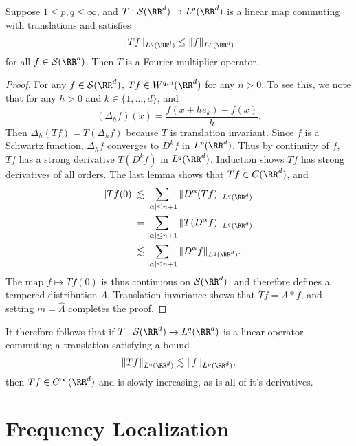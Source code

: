 \begin{theorem}
  Suppose $1 \leq p,q \leq \infty$, and $T: \mathcal{S}(\RR^d) \to L^q(\RR^d)$ is a linear map commuting with translations and satisfies
  \[ \| Tf \|_{L^q(\RR^d)} \leq \| f \|_{L^p(\RR^d)} \]
  for all $f \in \mathcal{S}(\RR^d)$. Then $T$ is a Fourier multiplier operator.
\end{theorem}
\begin{proof}
  For any $f \in \mathcal{S}(\RR^d)$, $Tf \in W^{q,n}(\RR^d)$ for any $n > 0$. To see this, we note that for any $h > 0$ and $k \in \{ 1, \dots, d \}$, and
  \[ (\Delta_h f)(x) = \frac{f(x + he_k) - f(x)}{h}. \]
  Then $\Delta_h(T f) = T(\Delta_h f)$ because $T$ is translation invariant. Since $f$ is a Schwartz function, $\Delta_h f$ converges to $D^k f$ in $L^p(\RR^d)$. Thus by continuity of $f$, $Tf$ has a strong derivative $T(D^k f)$ in $L^q(\RR^d)$. Induction shows $Tf$ has strong derivatives of all orders. The last lemma shows that $Tf \in C(\RR^d)$, and
  \begin{align*}
    |Tf(0)| &\lesssim \sum_{|\alpha| \leq n+1} \| D^\alpha(Tf) \|_{L^q(\RR^d)}\\
    &= \sum_{|\alpha| \leq n+1} \| T(D^\alpha f) \|_{L^q(\RR^d)}\\
    &\lesssim \sum_{|\alpha| \leq n+1} \| D^\alpha f \|_{L^q(\RR^d)}.
  \end{align*}
  The map $f \mapsto Tf(0)$ is thus continuous on $\mathcal{S}(\RR^d)$, and therefore defines a tempered distribution $\Lambda$. Translation invariance shows that $Tf = \Lambda * f$, and setting $m = \widehat{\Lambda}$ completes the proof.
\end{proof}

\begin{remark}
    It therefore follows that if $T: \mathcal{S}(\RR^d) \to L^q(\RR^d)$ is a linear operator commuting a translation satisfying a bound
    \[ \| Tf \|_{L^q(\RR^d)} \lesssim \| f \|_{L^p(\RR^d)}, \]
    then $Tf \in C^\infty(\RR^d)$ and is slowly increasing, as is all of it's derivatives.
\end{remark}







\section{Frequency Localization}

